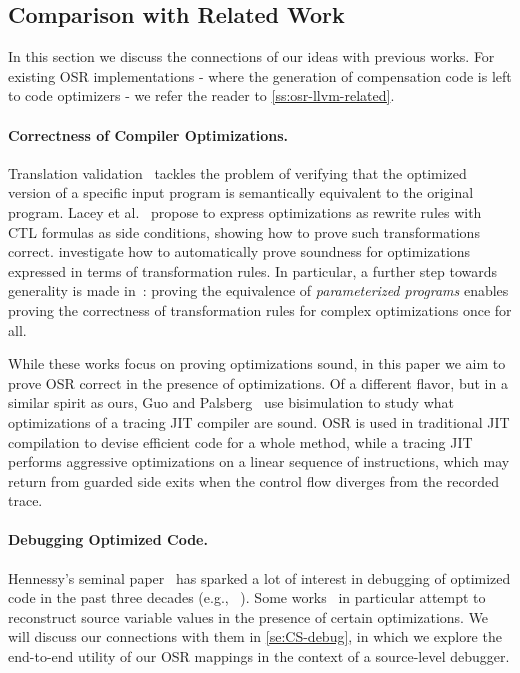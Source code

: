 \subsection{Comparison with Related Work}
In this section we discuss the connections of our ideas with previous works. For existing OSR implementations - where the generation of compensation code is left to code optimizers - we refer the reader to \mysection\ref{ss:osr-llvm-related}.

\paragraph*{Correctness of Compiler Optimizations.} Translation validation~\cite{Pnueli98, Necula00} tackles the problem of verifying that the optimized version of a specific input program is semantically equivalent to the original program. Lacey et al.~\cite{Lacey02, Lacey04} propose to express optimizations as rewrite rules with CTL formulas as side conditions, showing how to prove such transformations correct. \cite{Lerner03, Lerner05, Kundu09} investigate how to automatically prove soundness for optimizations expressed in terms of transformation rules. In particular, a further step towards generality is made in~\cite{Kundu09}: proving the equivalence of {\em parameterized programs} enables proving the correctness of transformation rules for complex optimizations once for all.

While these works focus on proving optimizations sound, in this paper we aim to prove OSR correct in the presence of optimizations. Of a different flavor, but in a similar spirit as ours, Guo and Palsberg~\cite{Guo11} use bisimulation to study what optimizations of a tracing JIT compiler are sound. OSR is used in traditional JIT compilation to devise efficient code for a whole method, while a tracing JIT performs aggressive optimizations on a linear sequence of instructions, which may return from guarded side exits when the control flow diverges from the recorded trace.

\paragraph*{Debugging Optimized Code.} Hennessy's seminal paper~\cite{Hennessy82} has sparked a lot of interest in debugging of optimized code in the past three decades (e.g., ~\cite{Coutant88, Adl-Tabatabai96, Wu99, Jaramillo00, Barr14}). Some works~\cite{Hennessy82, Wu99} in particular attempt to reconstruct source variable values in the presence of certain optimizations. We will discuss our connections with them in \mysection\ref{se:CS-debug}, in which we explore the end-to-end utility of our OSR mappings in the context of a source-level debugger.

